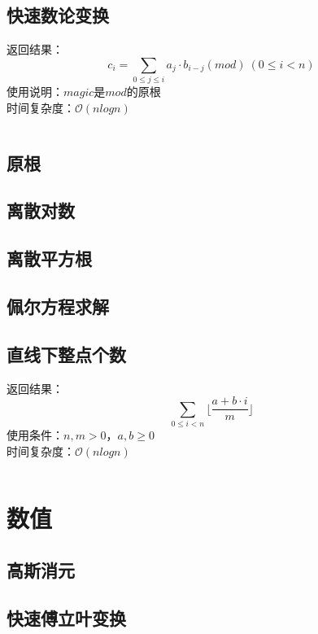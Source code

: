 \documentclass[a4paper]{article}
\newcommand{\cppcode}[1]{
    \inputminted[mathescape]{cpp}{source/#1}
}
\begin{document}
\subsection{快速数论变换}

返回结果：$$c_i=\sum_{0 \leq j \leq i} a_j \cdot b_{i-j} (mod) \ (0 \leq i < n)$$
\indent 使用说明：$magic$是$mod$的原根\\
\indent 时间复杂度：$\mathcal{O}(n log n)$

\cppcode{number-theory/number-theoretic-transform.cpp}

\subsection{原根}

\subsection{离散对数}

\subsection{离散平方根}

\subsection{佩尔方程求解}

\subsection{直线下整点个数}

返回结果：$$\sum_{0 \leq i < n} \lfloor \frac{a + b \cdot i}{m} \rfloor$$
\indent 使用条件：$n, m > 0$，$a, b \geq 0$\\
\indent 时间复杂度：$\mathcal{O}(n log n)$

\cppcode{number-theory/lattice-count.cpp}

\section{数值}

\subsection{高斯消元}

\subsection{快速傅立叶变换}
\end{document}
